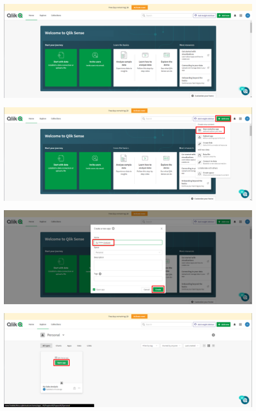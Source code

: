 \documentclass{article}
\begin{document}
    \begin{center}
		\includegraphics[width=14cm]{./images/1} 
	\end{center}
	\begin{center}
		\includegraphics[width=14cm]{./images/2} 
	\end{center}
	 \begin{center}
		\includegraphics[width=14cm]{./images/2.1} 
	\end{center}
	\begin{center}
		\includegraphics[width=14cm]{./images/2.2} 
	\end{center}
\end{document}
